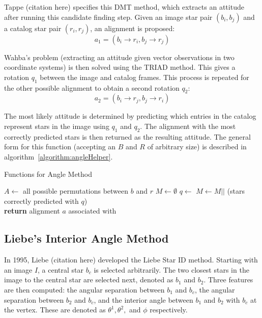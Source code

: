 Tappe (citation here) specifies this DMT method, which extracts an attitude after running this candidate finding step.
Given an image star pair $(b_i, b_j)$ and a catalog star pair $(r_i, r_j)$, an alignment is proposed:
\begin{equation}
    a_1 = (b_i \rightarrow r_i, b_j \rightarrow r_j)
\end{equation}

Wahba's problem (extracting an attitude given vector observations in two coordinate systems) is then solved using the
TRIAD method. This gives a rotation $q_1$ between the image and catalog frames. This process is repeated for the other
possible alignment to obtain a second rotation $q_2$:
\begin{equation}
    a_2 = (b_i \rightarrow r_j, b_j \rightarrow r_i)
\end{equation}

The most likely attitude is determined by predicting which entries in the catalog represent stars in the image using
$q_1$ and $q_2$. The alignment with the most correctly predicted stars is then returned as the resulting attitude.
The general form for this function (accepting an $B$ and $R$ of arbitrary size) is described
in algorithm~\autoref{algorithm:angleHelper}.

\begin{algorithm}
    \caption{Functions for Angle Method} \label{algorithm:angleHelper}
    \begin{algorithmic}[1]
        \State $A \gets $ all possible permutations between $b$ and $r$
        \State $M \gets \emptyset$
        \State $q \gets $ 
        \State $M \gets M ||$ (stars correctly predicted with $q$)
        \EndFor
        \\
        \State \textbf{return} alignment $a$ associated with 
        \EndFunction
    \end{algorithmic}
\end{algorithm}

\subsection{Liebe's Interior Angle Method}\label{subsec:liebe'sInteriorAngleMethod}
In 1995, Liebe (citation here) developed the Liebe Star ID method. Starting with an image $I$, a central star $b_c$ is
selected arbitrarily. The two closest stars in the image to the central star are selected next, denoted as $b_1$ and
$b_2$. Three features are then computed: the angular separation between $b_1$ and $b_c$, the angular separation between
$b_2$ and $b_c$, and the interior angle between $b_1$ and $b_2$ with $b_c$ at the vertex. These are denoted as
$\theta^1, \theta^2,$ and $\phi$ respectively.

